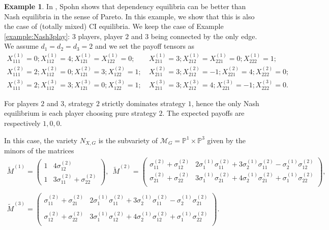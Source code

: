 \documentclass[11pt]{amsart}
\numberwithin{equation}{section}
\theoremstyle{plain}
\numberwithin{theorem}{section}
\theoremstyle{definition}
\newtheorem{example}[theorem]{Example}
\newcommand{\PP}{{\mathbb P}}
\begin{document}
\begin{example}\label{ex 2 2-2}
    In \cite{spohn2007dependency}, Spohn shows that
    dependency equilibria can be better than Nash equilibria in the sense of Pareto. In this example, we show that this is also the case of (totally mixed) CI equilibria.
    We keep the case of Example \ref{example:Nash3play}: $3$ players, player $2$ and $3$ being connected by the only edge. We assume $d_1=d_2=d_3=2$ and we set the payoff tensors as 
    \begin{align*}
    X^{(1)}_{111}=0;X^{(1)}_{112}=4;X^{(1)}_{121}=X^{(1)}_{122}=0;&~X^{(1)}_{211}=3;X^{(1)}_{212}=X^{(1)}_{221}=0;X^{(1)}_{222}=1;\\
    X^{(2)}_{111}=2;X^{(2)}_{112}=0;X^{(2)}_{121}=3;X^{(2)}_{122}=1;&~X^{(2)}_{211}=3;X^{(2)}_{212}=-1;X^{(2)}_{221}=4;X^{(2)}_{222}=0;\\
    X^{(3)}_{111}=2;X^{(3)}_{112}=3;X^{(3)}_{121}=0;X^{(3)}_{122}=1;&~X^{(3)}_{211}=3;X^{(3)}_{212}=4;X^{(3)}_{221}=-1;X^{(3)}_{222}=0.
    \end{align*}
    
For players $2$ and $3$, strategy $2$ strictly dominates strategy $1$, hence the only Nash equilibrium is each player choosing pure strategy $2$. The expected payoffs are respectively $1,0,0$.


In this case, the variety $N_{X,G}$ is the subvariety of $\mathcal{M}_G=\PP^1\times \PP^3$ given by the minors of the matrices
\begin{equation*}
\begin{array}{c}
\widetilde{M}^{(1)} = \begin{pmatrix}
    1 & 4\sigma^{(2)}_{12}\\
    1 & 3\sigma^{(2)}_{11}+\sigma^{(2)}_{22}
\end{pmatrix},\,\,\,
\widetilde{M}^{(2)} = \begin{pmatrix}
    \sigma^{(2)}_{11}+\sigma^{(2)}_{12} & 2\sigma^{(1)}_1\sigma^{(2)}_{11} + 3\sigma^{(1)}_2\sigma^{(2)}_{11} -\sigma^{(1)}_2\sigma^{(2)}_{12} \\
        \sigma^{(2)}_{21}+\sigma^{(2)}_{22} & 3\sigma^{(1)}_1\sigma^{(2)}_{21} + 4\sigma^{(1)}_2\sigma^{(2)}_{21} +\sigma^{(1)}_1\sigma^{(2)}_{22} \\
\end{pmatrix},\\  \\ \widetilde{M}^{(3)} = \begin{pmatrix}
    \sigma^{(2)}_{11}+\sigma^{(2)}_{21} & 2\sigma^{(1)}_1\sigma^{(2)}_{11} + 3\sigma^{(1)}_2\sigma^{(2)}_{11} -\sigma^{(1)}_2\sigma^{(2)}_{21} \\ \\
        \sigma^{(2)}_{12}+\sigma^{(2)}_{22} & 3\sigma^{(1)}_1\sigma^{(2)}_{12} + 4\sigma^{(1)}_2\sigma^{(2)}_{12} +\sigma^{(1)}_1\sigma^{(2)}_{22} \\
\end{pmatrix}.  
\end{array}
\end{equation*}


\end{example}
\end{document}
